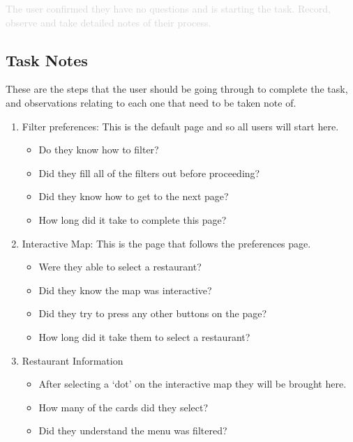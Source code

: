 \documentclass[a4 paper, 12pt]{article}
\begin{document}
        \textcolor{lightgray}{The user confirmed they have no questions and is starting the task.  Record, observe and take detailed notes of their process.}

    \subsection*{Task Notes}
        These are the steps that the user should be going through to complete the task, and observations relating to each one that need to be taken note of.

        \begin{enumerate}
            \item Filter preferences: 
            This is the default page and so all users will start here.
                \begin{itemize}
                    \item Do they know how to filter?
                    \item Did they fill all of the filters out before proceeding?
                    \item Did they know how to get to the next page?
                    \item How long did it take to complete this page?
                \end{itemize} 
            \item Interactive Map:
            This is the page that follows the preferences page.
                \begin{itemize}
                    \item Were they able to select a restaurant?
                    \item Did they know the map was interactive?
                    \item Did they try to press any other buttons on the page?
                    \item How long did it take them to select a restaurant?
                \end{itemize}
            \item Restaurant Information
                \begin{itemize}
                    \item After selecting a ‘dot’ on the interactive map they will be brought here. 
                    \item How many of the cards did they select?
                    \item Did they understand the menu was filtered?

\end{itemize}
\end{enumerate}
\end{document}
